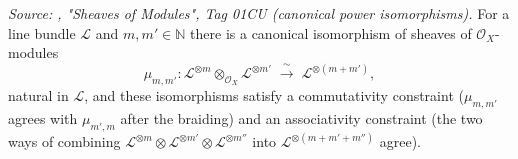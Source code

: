 \begin{lemma}\leanok
  \label{lem:sheafTensorPow_add}
  \textit{Source: \cite{stacks-project}, "Sheaves of Modules", Tag 01CU (canonical
  power isomorphisms).}
  For a line bundle \(\mathcal{L}\) and \(m, m' \in \mathbb{N}\) there is a
  canonical isomorphism of sheaves of \(\mathcal{O}_X\)-modules
  \[
    \mu_{m,m'} :
    \mathcal{L}^{\otimes m} \otimes_{\mathcal{O}_X} \mathcal{L}^{\otimes m'}
    \;\xrightarrow{\ \sim\ }\; \mathcal{L}^{\otimes (m+m')},
  \]
  natural in \(\mathcal{L}\), and these isomorphisms satisfy a commutativity
  constraint (\(\mu_{m,m'}\) agrees with \(\mu_{m',m}\) after the braiding) and
  an associativity constraint (the two ways of combining
  \(\mathcal{L}^{\otimes m} \otimes \mathcal{L}^{\otimes m'} \otimes
  \mathcal{L}^{\otimes m''}\) into \(\mathcal{L}^{\otimes (m+m'+m'')}\) agree).
\end{lemma}

